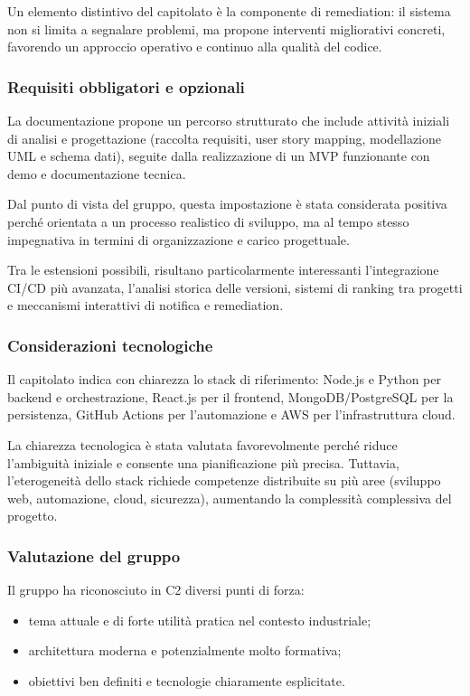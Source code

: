 \documentclass[a4paper,12pt]{article}
\begin{document}
Un elemento distintivo del capitolato è la componente di remediation: il sistema non si limita a segnalare problemi, ma propone interventi migliorativi concreti, favorendo un approccio operativo e continuo alla qualità del codice.

\subsubsection{Requisiti obbligatori e opzionali}

La documentazione propone un percorso strutturato che include attività iniziali di analisi e progettazione (raccolta requisiti, user story mapping, modellazione UML e schema dati), seguite dalla realizzazione di un MVP funzionante con demo e documentazione tecnica.

Dal punto di vista del gruppo, questa impostazione è stata considerata positiva perché orientata a un processo realistico di sviluppo, ma al tempo stesso impegnativa in termini di organizzazione e carico progettuale.

Tra le estensioni possibili, risultano particolarmente interessanti l'integrazione CI/CD più avanzata, l'analisi storica delle versioni, sistemi di ranking tra progetti e meccanismi interattivi di notifica e remediation.

\subsubsection{Considerazioni tecnologiche}

Il capitolato indica con chiarezza lo stack di riferimento: Node.js e Python per backend e orchestrazione, React.js per il frontend, MongoDB/PostgreSQL per la persistenza, GitHub Actions per l'automazione e AWS per l'infrastruttura cloud.

La chiarezza tecnologica è stata valutata favorevolmente perché riduce l'ambiguità iniziale e consente una pianificazione più precisa. Tuttavia, l'eterogeneità dello stack richiede competenze distribuite su più aree (sviluppo web, automazione, cloud, sicurezza), aumentando la complessità complessiva del progetto.

\subsubsection{Valutazione del gruppo}

Il gruppo ha riconosciuto in C2 diversi punti di forza:

\begin{itemize}
    \item tema attuale e di forte utilità pratica nel contesto industriale;
    \item architettura moderna e potenzialmente molto formativa;
    \item obiettivi ben definiti e tecnologie chiaramente esplicitate.
\end{itemize}
\end{document}
